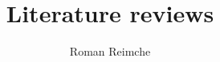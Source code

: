\documentclass[]{reflection}
\title{Literature reviews}
\author{Roman Reimche
  \institute{RPTU Kaiserslautern-Landau, Faculty of Business and Economics}}
\begin{document}

\maketitle







\medskip



\end{document}
